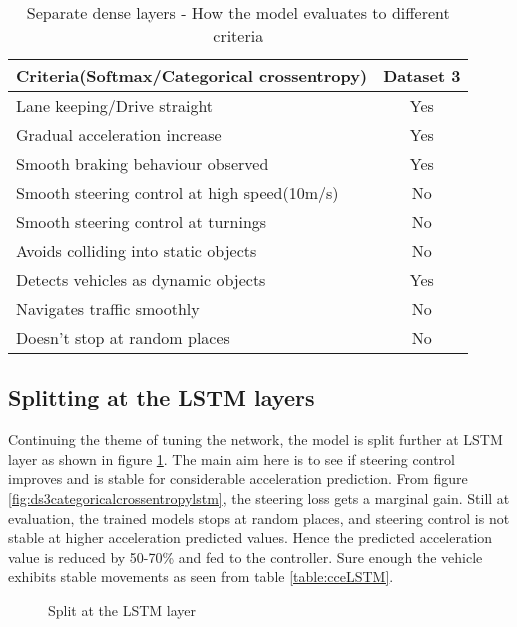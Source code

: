 \begin{table}[h]
    \centering
\begin{tabular}{lc}
    \toprule
    Criteria(Softmax/Categorical crossentropy)  & Dataset 3 \\\midrule
    Lane keeping/Drive straight  & Yes  \\
    Gradual acceleration increase  & Yes\\
    Smooth braking behaviour observed & Yes \\
    Smooth steering control at high speed(10m/s) & No \\
    Smooth steering control at turnings & No\\
    Avoids colliding into static objects & No \\
    Detects vehicles as dynamic objects & Yes \\
    Navigates traffic smoothly & No\\
    Doesn't stop at random places & No \\\bottomrule
\end{tabular}
\caption{Separate dense layers - How the model evaluates to different criteria}
\label{table:ccedense}
\end{table}
\newpage
\subsection{Splitting at the LSTM layers}
Continuing the theme of tuning the network, the model is split further at LSTM layer as shown in figure
\ref{fig:steeringlstmsplit}. The main aim here is to see if steering control improves and
is stable for considerable acceleration prediction. From figure
\ref{fig:ds3categoricalcrossentropylstm}, the steering loss gets a marginal gain. Still at
evaluation, the trained models stops at random places, and steering control is not stable at
higher acceleration predicted values. Hence the predicted acceleration value is reduced by
50-70\% and fed to the controller. Sure enough the vehicle exhibits stable movements as
seen from table \ref{table:cceLSTM}.

\begin{figure}[!ht]
	\centering
    \def\svgwidth{0.5\textwidth}
    \caption{Split at the LSTM layer}
    \label{fig:steeringlstmsplit}
\end{figure}

